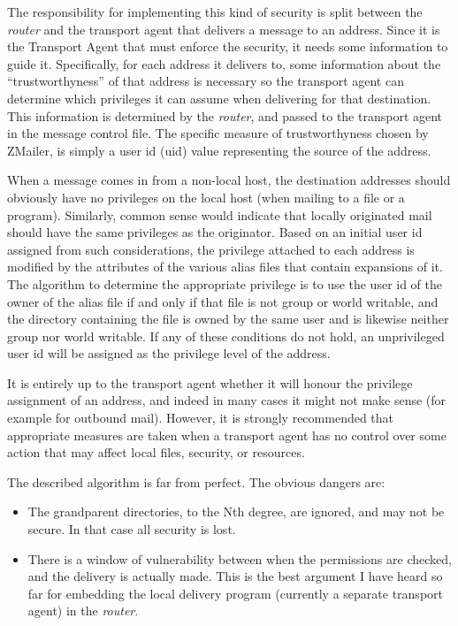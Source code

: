 The responsibility for implementing this kind of security is split between
the {\em router\/} and the transport agent that delivers a message to
an address.
Since it is the Transport Agent that must enforce the security, it needs
some information to guide it.  Specifically, for each address it delivers
to, some information about the ``trustworthyness'' of that address is
necessary so the transport agent can determine which privileges it can
assume when delivering for that destination.  This information is
determined by the {\em router\/}, and passed to the transport agent in the message
control file.  The specific measure of trustworthyness chosen by ZMailer, 
is simply a user id (uid) value representing the source of the address.

When a message comes in from a non-local host, the destination addresses
should obviously have no privileges on the local host (when mailing to a
file or a program).  Similarly, common sense would indicate that locally
originated mail should have the same privileges as the originator.  Based
on an initial user id assigned from such considerations, the privilege
attached to each address is modified by the attributes of the various alias
files that contain expansions of it.  The algorithm to determine the
appropriate privilege is to use the user id of the owner of the alias file
if and only if that file is not group or world writable, and the directory
containing the file is owned by the same user and is likewise neither group
nor world writable.  If any of these conditions do not hold, an
unprivileged user id will be assigned as the privilege level of the
address.



It is entirely up to the transport agent whether it will honour the
privilege assignment of an address, and indeed in many cases it might not
make sense (for example for outbound mail).  However, it is strongly
recommended that appropriate measures are taken when a transport agent has
no control over some action that may affect local files, security, or
resources.



The described algorithm is far from perfect. The obvious dangers are:

\begin{itemize}
\item The grandparent directories, to the Nth degree, are ignored, and may
not be secure. In that case all security is lost.
\item There is a window of vulnerability between when the permissions are
checked, and the delivery is actually made. This is the best argument
I have heard so far for embedding the local delivery program
(currently a separate transport agent) in the {\em router\/}.
\end{itemize}


